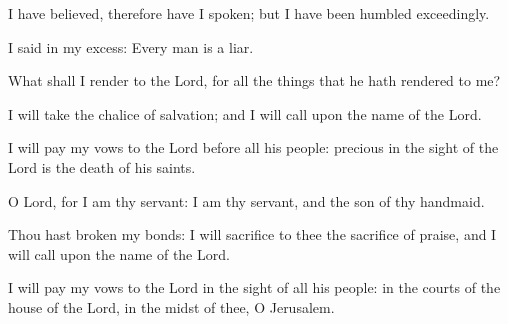 \item I have believed, therefore have I spoken; but I have been humbled exceedingly.
\item I said in my excess: Every man is a liar.
\item What shall I render to the Lord, for all the things that he hath rendered to me?
\item I will take the chalice of salvation; and I will call upon the name of the Lord.
\item I will pay my vows to the Lord before all his people: precious in the sight of the Lord is the death of his saints.
\item O Lord, for I am thy servant: I am thy servant, and the son of thy handmaid.
\item Thou hast broken my bonds: I will sacrifice to thee the sacrifice of praise, and I will call upon the name of the Lord.
\item I will pay my vows to the Lord in the sight of all his people: in the courts of the house of the Lord, in the midst of thee, O Jerusalem.